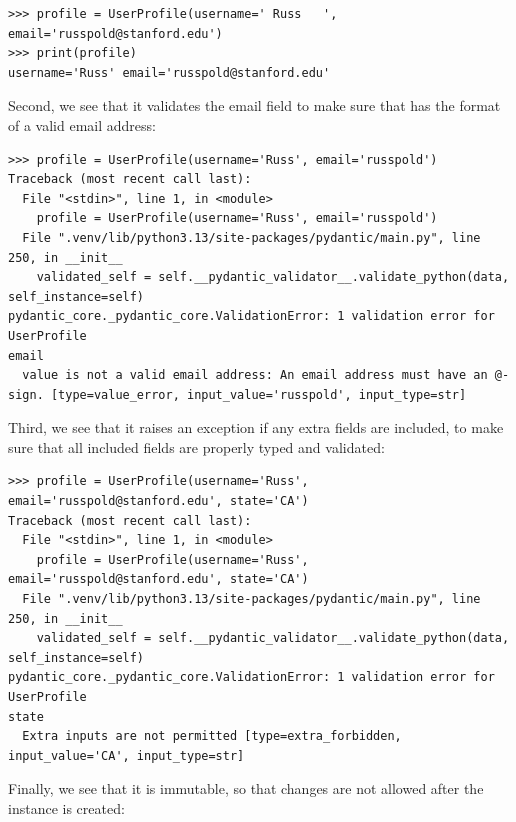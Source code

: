\begin{lstlisting}[style=replshort]
>>> profile = UserProfile(username=' Russ   ', email='russpold@stanford.edu')
>>> print(profile)
username='Russ' email='russpold@stanford.edu'
\end{lstlisting}

Second, we see that it validates the email field to make sure that has the format of a valid email address: 

\begin{lstlisting}[style=repl]
>>> profile = UserProfile(username='Russ', email='russpold')
Traceback (most recent call last):
  File "<stdin>", line 1, in <module>
    profile = UserProfile(username='Russ', email='russpold')
  File ".venv/lib/python3.13/site-packages/pydantic/main.py", line 250, in __init__
    validated_self = self.__pydantic_validator__.validate_python(data, self_instance=self)
pydantic_core._pydantic_core.ValidationError: 1 validation error for UserProfile
email
  value is not a valid email address: An email address must have an @-sign. [type=value_error, input_value='russpold', input_type=str]
\end{lstlisting}

Third, we see that it raises an exception if any extra fields are included, to make sure that all included fields are properly typed and validated:

\begin{lstlisting}[style=repl]
>>> profile = UserProfile(username='Russ', email='russpold@stanford.edu', state='CA')
Traceback (most recent call last):
  File "<stdin>", line 1, in <module>
    profile = UserProfile(username='Russ', email='russpold@stanford.edu', state='CA')
  File ".venv/lib/python3.13/site-packages/pydantic/main.py", line 250, in __init__
    validated_self = self.__pydantic_validator__.validate_python(data, self_instance=self)
pydantic_core._pydantic_core.ValidationError: 1 validation error for UserProfile
state
  Extra inputs are not permitted [type=extra_forbidden, input_value='CA', input_type=str]
\end{lstlisting}

Finally, we see that it is immutable, so that changes are not allowed after the instance is created:

